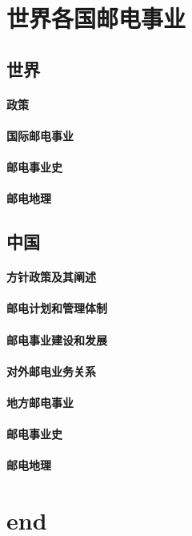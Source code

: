 \documentclass[UTF8]{../../RepresentationUniverse}
\begin{document}
\chapter{世界各国邮电事业}
\section{世界}
    \subsubsection{政策}
    \subsubsection{国际邮电事业}
    \subsubsection{邮电事业史}
    \subsubsection{邮电地理}
\section{中国}
    \subsubsection{方针政策及其阐述}
    \subsubsection{邮电计划和管理体制}
    \subsubsection{邮电事业建设和发展}
    \subsubsection{对外邮电业务关系}
    \subsubsection{地方邮电事业}
    \subsubsection{邮电事业史}
    \subsubsection{邮电地理}







\chapter{end}
\end{document}
